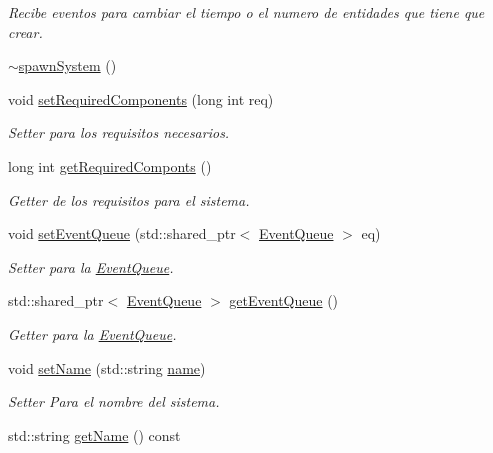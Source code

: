 \begin{DoxyCompactItemize}
\begin{DoxyCompactList}\small\item\em Recibe eventos para cambiar el tiempo o el numero de entidades que tiene que crear. \end{DoxyCompactList}\item 
\hyperlink{classant_1_1spawn_system_aa6aaf615d55fd08d59a0a5ad9faeb024}{$\sim$spawn\+System} ()
\item 
void \hyperlink{classant_1_1_system_a35662ff3739ff4290df1106bfdccfaca}{set\+Required\+Components} (long int req)
\begin{DoxyCompactList}\small\item\em Setter para los requisitos necesarios. \end{DoxyCompactList}\item 
long int \hyperlink{classant_1_1_system_a2d94338969f43d4fd2fd972deb099258}{get\+Required\+Componts} ()
\begin{DoxyCompactList}\small\item\em Getter de los requisitos para el sistema. \end{DoxyCompactList}\item 
void \hyperlink{classant_1_1_system_a1effe9f0e5615e516a34be02d5895434}{set\+Event\+Queue} (std\+::shared\+\_\+ptr$<$ \hyperlink{classant_1_1_event_queue}{Event\+Queue} $>$ eq)
\begin{DoxyCompactList}\small\item\em Setter para la \hyperlink{classant_1_1_event_queue}{Event\+Queue}. \end{DoxyCompactList}\item 
std\+::shared\+\_\+ptr$<$ \hyperlink{classant_1_1_event_queue}{Event\+Queue} $>$ \hyperlink{classant_1_1_system_ac3e2bbbdb622276d194ad3a687d8e4f1}{get\+Event\+Queue} ()
\begin{DoxyCompactList}\small\item\em Getter para la \hyperlink{classant_1_1_event_queue}{Event\+Queue}. \end{DoxyCompactList}\item 
void \hyperlink{classant_1_1_system_a231f9fc93b55ee67deb9597ae6be13ba}{set\+Name} (std\+::string \hyperlink{classant_1_1_system_a60b3c00a760a3b4947ab1f1fc534a5b2}{name})
\begin{DoxyCompactList}\small\item\em Setter Para el nombre del sistema. \end{DoxyCompactList}\item 
std\+::string \hyperlink{classant_1_1_system_a52a559b2c3ddbec5c846df1badd7f7f8}{get\+Name} () const 

\end{DoxyCompactItemize}
